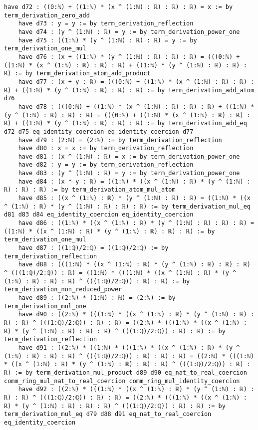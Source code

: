 \documentclass{article}
\begin{document}
\begin{tcolorbox}[colback=white!10, width=\linewidth]
\begin{lstlisting}[language=Lean4]
    have d72 : ((0:ℕ) + ((1:ℕ) * (x ^ (1:ℕ) : ℝ) : ℝ) : ℝ) = x := by term_derivation_zero_add
    have d73 : y = y := by term_derivation_reflection
    have d74 : (y ^ (1:ℕ) : ℝ) = y := by term_derivation_power_one
    have d75 : ((1:ℕ) * (y ^ (1:ℕ) : ℝ) : ℝ) = y := by term_derivation_one_mul
    have d76 : (x + ((1:ℕ) * (y ^ (1:ℕ) : ℝ) : ℝ) : ℝ) = (((0:ℕ) + ((1:ℕ) * (x ^ (1:ℕ) : ℝ) : ℝ) : ℝ) + ((1:ℕ) * (y ^ (1:ℕ) : ℝ) : ℝ) : ℝ) := by term_derivation_atom_add_product
    have d77 : (x + y : ℝ) = (((0:ℕ) + ((1:ℕ) * (x ^ (1:ℕ) : ℝ) : ℝ) : ℝ) + ((1:ℕ) * (y ^ (1:ℕ) : ℝ) : ℝ) : ℝ) := by term_derivation_add_atom d76
    have d78 : (((0:ℕ) + ((1:ℕ) * (x ^ (1:ℕ) : ℝ) : ℝ) : ℝ) + ((1:ℕ) * (y ^ (1:ℕ) : ℝ) : ℝ) : ℝ) = (((0:ℕ) + ((1:ℕ) * (x ^ (1:ℕ) : ℝ) : ℝ) : ℝ) + ((1:ℕ) * (y ^ (1:ℕ) : ℝ) : ℝ) : ℝ) := by term_derivation_add_eq d72 d75 eq_identity_coercion eq_identity_coercion d77
    have d79 : (2:ℕ) = (2:ℕ) := by term_derivation_reflection
    have d80 : x = x := by term_derivation_reflection
    have d81 : (x ^ (1:ℕ) : ℝ) = x := by term_derivation_power_one
    have d82 : y = y := by term_derivation_reflection
    have d83 : (y ^ (1:ℕ) : ℝ) = y := by term_derivation_power_one
    have d84 : (x * y : ℝ) = ((1:ℕ) * ((x ^ (1:ℕ) : ℝ) * (y ^ (1:ℕ) : ℝ) : ℝ) : ℝ) := by term_derivation_atom_mul_atom
    have d85 : ((x ^ (1:ℕ) : ℝ) * (y ^ (1:ℕ) : ℝ) : ℝ) = ((1:ℕ) * ((x ^ (1:ℕ) : ℝ) * (y ^ (1:ℕ) : ℝ) : ℝ) : ℝ) := by term_derivation_mul_eq d81 d83 d84 eq_identity_coercion eq_identity_coercion
    have d86 : ((1:ℕ) * ((x ^ (1:ℕ) : ℝ) * (y ^ (1:ℕ) : ℝ) : ℝ) : ℝ) = ((1:ℕ) * ((x ^ (1:ℕ) : ℝ) * (y ^ (1:ℕ) : ℝ) : ℝ) : ℝ) := by term_derivation_one_mul
    have d87 : ((1:ℚ)/2:ℚ) = ((1:ℚ)/2:ℚ) := by term_derivation_reflection
    have d88 : (((1:ℕ) * ((x ^ (1:ℕ) : ℝ) * (y ^ (1:ℕ) : ℝ) : ℝ) : ℝ) ^ (((1:ℚ)/2:ℚ)) : ℝ) = ((1:ℕ) * (((1:ℕ) * ((x ^ (1:ℕ) : ℝ) * (y ^ (1:ℕ) : ℝ) : ℝ) : ℝ) ^ (((1:ℚ)/2:ℚ)) : ℝ) : ℝ) := by term_derivation_non_reduced_power
    have d89 : ((2:ℕ) * (1:ℕ) : ℕ) = (2:ℕ) := by term_derivation_mul_one
    have d90 : ((2:ℕ) * (((1:ℕ) * ((x ^ (1:ℕ) : ℝ) * (y ^ (1:ℕ) : ℝ) : ℝ) : ℝ) ^ (((1:ℚ)/2:ℚ)) : ℝ) : ℝ) = ((2:ℕ) * (((1:ℕ) * ((x ^ (1:ℕ) : ℝ) * (y ^ (1:ℕ) : ℝ) : ℝ) : ℝ) ^ (((1:ℚ)/2:ℚ)) : ℝ) : ℝ) := by term_derivation_reflection
    have d91 : ((2:ℕ) * ((1:ℕ) * (((1:ℕ) * ((x ^ (1:ℕ) : ℝ) * (y ^ (1:ℕ) : ℝ) : ℝ) : ℝ) ^ (((1:ℚ)/2:ℚ)) : ℝ) : ℝ) : ℝ) = ((2:ℕ) * (((1:ℕ) * ((x ^ (1:ℕ) : ℝ) * (y ^ (1:ℕ) : ℝ) : ℝ) : ℝ) ^ (((1:ℚ)/2:ℚ)) : ℝ) : ℝ) := by term_derivation_mul_product d89 d90 eq_nat_to_real_coercion comm_ring_mul_nat_to_real_coercion comm_ring_mul_identity_coercion
    have d92 : ((2:ℕ) * (((1:ℕ) * ((x ^ (1:ℕ) : ℝ) * (y ^ (1:ℕ) : ℝ) : ℝ) : ℝ) ^ (((1:ℚ)/2:ℚ)) : ℝ) : ℝ) = ((2:ℕ) * (((1:ℕ) * ((x ^ (1:ℕ) : ℝ) * (y ^ (1:ℕ) : ℝ) : ℝ) : ℝ) ^ (((1:ℚ)/2:ℚ)) : ℝ) : ℝ) := by term_derivation_mul_eq d79 d88 d91 eq_nat_to_real_coercion eq_identity_coercion

\end{lstlisting}
\end{tcolorbox}
\end{document}
